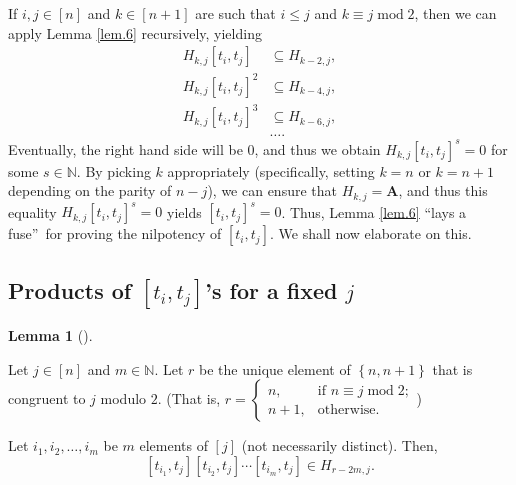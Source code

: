 \documentclass[numbers=enddot,12pt,final,onecolumn,notitlepage]{scrartcl}%
\theoremstyle{definition}
\newtheorem{lem}[theo]{Lemma}
\newenvironment{lemma}[1][]
{\begin{lem}[#1]\begin{leftbar}}
{\end{leftbar}\end{lem}}
\begin{document}
If $i,j\in\left[  n\right]  $ and $k\in\left[  n+1\right]  $ are such that
$i\leq j$ and $k\equiv j\operatorname{mod}2$, then we can apply Lemma
\ref{lem.6} recursively, yielding%
\begin{align*}
H_{k,j}\left[  t_{i},t_{j}\right]   &  \subseteq H_{k-2,j},\\
H_{k,j}\left[  t_{i},t_{j}\right]  ^{2}  &  \subseteq H_{k-4,j},\\
H_{k,j}\left[  t_{i},t_{j}\right]  ^{3}  &  \subseteq H_{k-6,j},\\
&  \ldots.
\end{align*}
Eventually, the right hand side will be $0$, and thus we obtain $H_{k,j}%
\left[  t_{i},t_{j}\right]  ^{s}=0$ for some $s\in\mathbb{N}$. By picking $k$
appropriately (specifically, setting $k=n$ or $k=n+1$ depending on the parity
of $n-j$), we can ensure that $H_{k,j}=\mathbf{A}$, and thus this equality
$H_{k,j}\left[  t_{i},t_{j}\right]  ^{s}=0$ yields $\left[  t_{i}%
,t_{j}\right]  ^{s}=0$. Thus, Lemma \ref{lem.6} \textquotedblleft lays a
fuse\textquotedblright\ for proving the nilpotency of $\left[  t_{i}%
,t_{j}\right]  $. We shall now elaborate on this.

\subsection{Products of $\left[  t_{i},t_{j}\right]  $'s for a fixed $j$}

\begin{lemma}
\label{lem.right-bound-1}Let $j\in\left[  n\right]  $ and $m\in\mathbb{N}$.
Let $r$ be the unique element of $\left\{  n,n+1\right\}  $ that is congruent
to $j$ modulo $2$. (That is, $r=%
\begin{cases}
n, & \text{if }n\equiv j\operatorname{mod}2;\\
n+1, & \text{otherwise.}%
\end{cases}
$)

Let $i_{1},i_{2},\ldots,i_{m}$ be $m$ elements of $\left[  j\right]  $ (not
necessarily distinct). Then,
\[
\left[  t_{i_{1}},t_{j}\right]  \left[  t_{i_{2}},t_{j}\right]  \cdots\left[
t_{i_{m}},t_{j}\right]  \in H_{r-2m,j}.
\]

\end{lemma}
\end{document}
